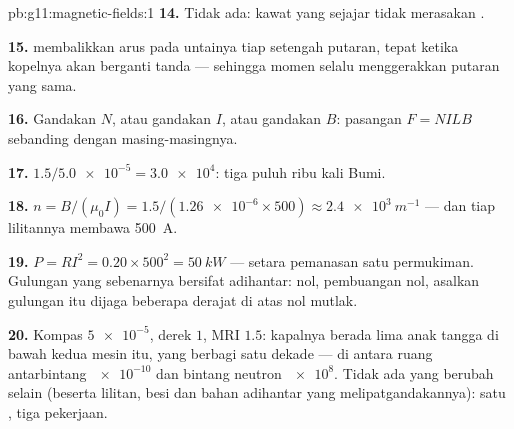 \begin{solution}{pb:g11:magnetic-fields:1}
\textbf{14.} Tidak ada: kawat yang sejajar  tidak merasakan
.

\textbf{15.}  membalikkan arus pada untainya tiap setengah
putaran, tepat ketika kopelnya akan berganti tanda --- sehingga momen
 selalu menggerakkan putaran yang sama.

\textbf{16.} Gandakan $N$, atau gandakan $I$, atau gandakan $B$:
pasangan  $F = NILB$ sebanding dengan masing-masingnya.

\textbf{17.} $1.5 / \num{5.0e-5} = \num{3.0e4}$: tiga puluh ribu kali
 Bumi.

\textbf{18.} $n = B/(\mu_0 I) = 1.5 / (\num{1.26e-6} \times 500)
\approx \qty{2.4e3}{m^{-1}}$ --- dan tiap lilitannya membawa
\qty{500}{A}.

\textbf{19.} $P = RI^2 = 0.20 \times 500^2 = \qty{50}{kW}$ --- setara
pemanasan satu permukiman. Gulungan yang sebenarnya bersifat adihantar:
 nol, pembuangan  nol, asalkan gulungan itu dijaga
beberapa derajat di atas nol mutlak.

\textbf{20.} Kompas $\num{5e-5}$, derek $1$, MRI $1.5$: kapalnya berada
lima anak tangga di bawah kedua mesin itu, yang berbagi satu dekade ---
di antara ruang antarbintang $\num{e-10}$ dan bintang neutron
$\num{e8}$. Tidak ada yang berubah selain  (beserta lilitan,
besi dan bahan adihantar yang melipatgandakannya): satu , tiga
pekerjaan.
\end{solution}
